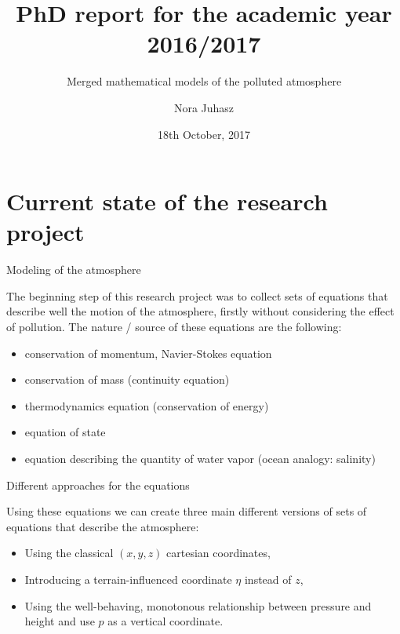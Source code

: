 \documentclass{beamer}
\title{PhD report for the academic year 2016/2017}
\subtitle{Merged mathematical models of the polluted atmosphere}
\author{Nora Juhasz}
\institute{Department of Information Engineering, Computer Science and Mathematics \\ University of L'Aquila \\ Supervisor: Prof. Donatella Donatelli}
\date{18th October, 2017}
\begin{document}
\begin{frame}
\titlepage
\end{frame}

\section{Current state of the research project}

\begin{frame}{Modeling of the atmosphere}

  The beginning step of this research project was to collect sets of equations that describe well the motion of the atmosphere, firstly without considering the effect of pollution. The nature / source of these equations are the following:
  \begin{itemize}
  \item
    conservation of momentum, Navier-Stokes equation
  \item
    conservation of mass (continuity equation)
  \item
    thermodynamics equation (conservation of energy)
  \item
    equation of state
  \item
    equation describing the quantity of water vapor (ocean analogy: salinity)
  \end{itemize}

\end{frame}

\begin{frame}{Different approaches for the equations}

  Using these equations we can create three main different versions of sets of equations that describe the atmosphere:
  \begin{itemize}
  \item
    Using the classical $(x, y, z)$ cartesian coordinates,
  \item
    Introducing a terrain-influenced coordinate $\eta$ instead of $z$,
  \item
    Using the well-behaving, monotonous relationship between pressure and height and use $p$ as a vertical coordinate.
  
  \end{itemize}

\end{frame}
\end{document}
